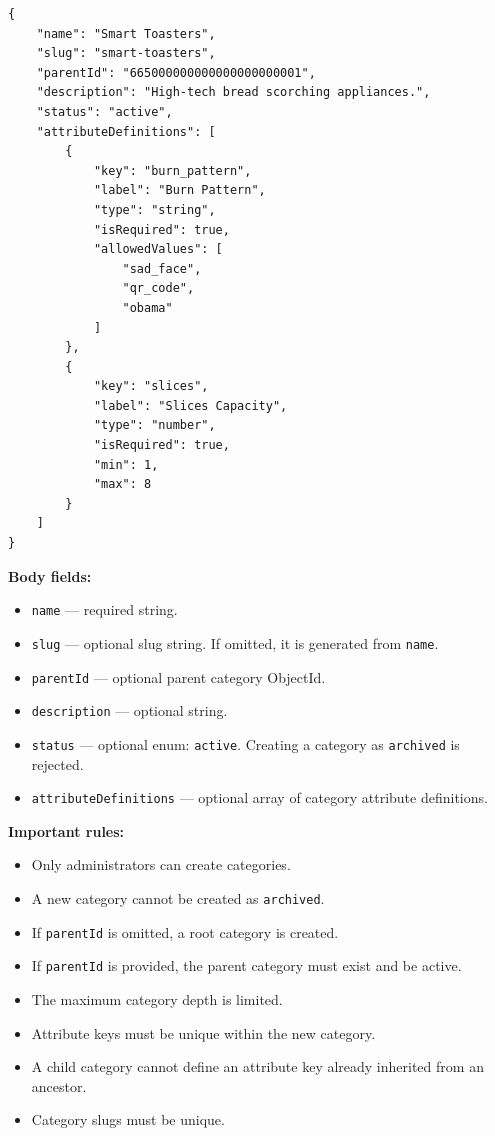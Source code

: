 \begin{verbatim}
{
    "name": "Smart Toasters",
    "slug": "smart-toasters",
    "parentId": "665000000000000000000001",
    "description": "High-tech bread scorching appliances.",
    "status": "active",
    "attributeDefinitions": [
        {
            "key": "burn_pattern",
            "label": "Burn Pattern",
            "type": "string",
            "isRequired": true,
            "allowedValues": [
                "sad_face",
                "qr_code",
                "obama"
            ]
        },
        {
            "key": "slices",
            "label": "Slices Capacity",
            "type": "number",
            "isRequired": true,
            "min": 1,
            "max": 8
        }
    ]
}
\end{verbatim}

\textbf{Body fields:}

\begin{itemize}
    \item \texttt{name} --- required string.
    \item \texttt{slug} --- optional slug string. If omitted, it is generated from \texttt{name}.
    \item \texttt{parentId} --- optional parent category ObjectId.
    \item \texttt{description} --- optional string.
    \item \texttt{status} --- optional enum: \texttt{active}. Creating a category as \texttt{archived} is rejected.
    \item \texttt{attributeDefinitions} --- optional array of category attribute definitions.
\end{itemize}

\textbf{Important rules:}

\begin{itemize}
    \item Only administrators can create categories.
    \item A new category cannot be created as \texttt{archived}.
    \item If \texttt{parentId} is omitted, a root category is created.
    \item If \texttt{parentId} is provided, the parent category must exist and be active.
    \item The maximum category depth is limited.
    \item Attribute keys must be unique within the new category.
    \item A child category cannot define an attribute key already inherited from an ancestor.
    \item Category slugs must be unique.
\end{itemize}

